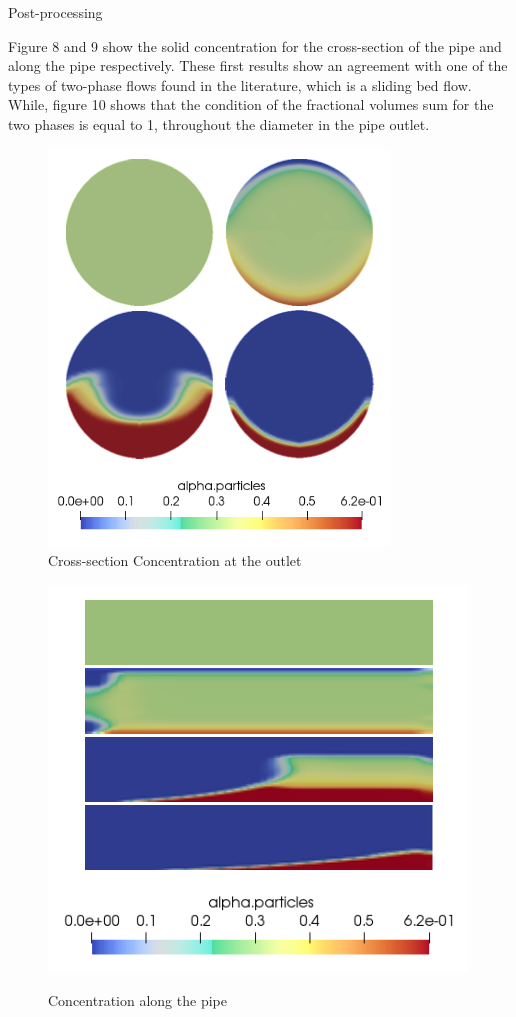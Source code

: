 \documentclass[11pt]{report}
\begin{document}
%
 \begin{itemize}
 \bf{\item Post-processing}
 \end{itemize}
 Figure 8 and 9 show the solid concentration for the cross-section of the pipe and along the pipe respectively. 
 These first results show an agreement with one of the types of two-phase flows found in the literature, which is a sliding bed flow. 
 While, figure 10 shows that the condition of the fractional volumes sum for the two phases is equal to 1, throughout the diameter in the  pipe outlet.\\
\begin{figure}[ht!]
 \begin{center}
 
 \includegraphics[trim=0cm 0cm 0cm 0cm,clip,scale=0.7]{figs/7.png}
 \caption{ \footnotesize{Cross-section Concentration at the outlet} }
 \label{fig:gauss}
 \end{center}
 \end{figure} 
%
 \begin{figure}[ht!]
 \begin{center}

 \includegraphics[trim=0cm 0cm 0cm 0cm,clip,scale=0.72]{figs/6.png}
 {\caption{ \footnotesize Concentration along the pipe}}
 \label{fig:gauss}
 \end{center}
 \end{figure} 
\end{document}
